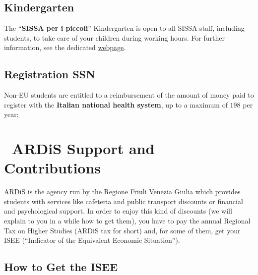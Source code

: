 \documentclass{sissavademecum}
\begin{document}
   \section{Kindergarten}
   
   
   The ``\textbf{SISSA per i piccoli}{}'' Kindergarten is open to all SISSA staff, including students, to take care of your children during working hours. For further information, see the dedicated \href{https://www.sissa.it/kindergarten}{webpage}.
   
    
    \section{Registration SSN}
    Non-EU students are entitled to a reimbursement of the amount of money paid to register with the \textbf{Italian national health system}, up to a maximum of \EUR{} $198$ per year;
    



\chapter{\texorpdfstring{\faTags\ }{}ARDiS Support and Contributions}
\hypertarget{ARDiS}{}

\href{http://www.ardiss.fvg.it}{ARDiS} is the agency run by the Regione Friuli Venezia Giulia which provides students with services like cafeteria and public transport discounts or financial and psychological support. In order to enjoy this kind of discounts (we will explain to you in a while how to get them), you have to pay the annual Regional Tax on Higher Studies (ARDiS tax for short) and, for some of them, get your ISEE (``Indicator of the Equivalent Economic Situation'').

\section{How to Get the ISEE}
\end{document}
